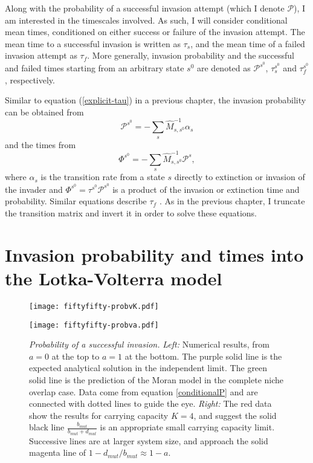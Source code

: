 Along with the probability of a successful invasion attempt (which I denote $\mathcal{P}$), I am interested in the timescales involved. 
As such, I will consider conditional mean times, conditioned on either success or failure of the invasion attempt. 
The mean time to a successful invasion is written as $\tau_s$, and the mean time of a failed invasion attempt as $\tau_f$. 
More generally, invasion probability and the successful and failed times starting from an arbitrary state $s^0$ are denoted as $\mathcal{P}^{s^0}$, $\tau_s^{s^0}$ and $\tau_f^{s^0}$, respectively. 

Similar to equation (\ref{explicit-tau}) in a previous chapter, the invasion probability can be obtained from \cite{Nisbet1982,Iyer-Biswas2015}
\begin{equation}
\mathcal{P}^{s^0} = -\sum_s \hat{M}^{-1}_{s,s^0}\alpha_{s} %
 \label{conditionalP}
\end{equation}
and the times from
\begin{equation}
\Phi^{s^0} = -\sum_s \hat{M}^{-1}_{s,s^0}\mathcal{P}^{s}, %
 \label{conditionalPhi}
\end{equation}
where $\alpha_s$ is the transition rate from a state $s$ directly to extinction or invasion of the invader and $\Phi^{s^0}=\tau^{s^0}\mathcal{P}^{s^0}$ is a product of the invasion or extinction time and probability. 
Similar equations describe $\tau_f$ \cite{Nisbet1982,Iyer-Biswas2015}.
As in the previous chapter, I truncate the transition matrix and invert it in order to solve these equations. 


\section{Invasion probability and times into the Lotka-Volterra model}
\begin{figure}[h]
	\centering
	\begin{minipage}{0.49\linewidth}
		\centering
		\texttt{[image: fiftyfifty-probvK.pdf]}
	\end{minipage}
	\begin{minipage}{0.49\linewidth}
		\centering
		\texttt{[image: fiftyfifty-probva.pdf]}
	\end{minipage}
	\caption{\emph{Probability of a successful invasion.}
		\emph{Left:} Numerical results, from $a=0$ at the top to $a=1$ at the bottom. The purple solid line is the expected analytical solution in the independent limit. The green solid line is the prediction of the Moran model in the complete niche overlap case. Data come from equation \ref{conditionalP} and are connected with dotted lines to guide the eye. 
		\emph{Right:} The red data show the results for carrying capacity $K=4$, and suggest the solid black line $\frac{b_{mut}}{b_{mut}+d_{mut}}$ is an appropriate small carrying capacity limit. Successive lines are at larger system size, and approach the solid magenta line of $1-d_{mut}/b_{mut}\approx 1-a$.
	} \label{Esucc}
\end{figure}

